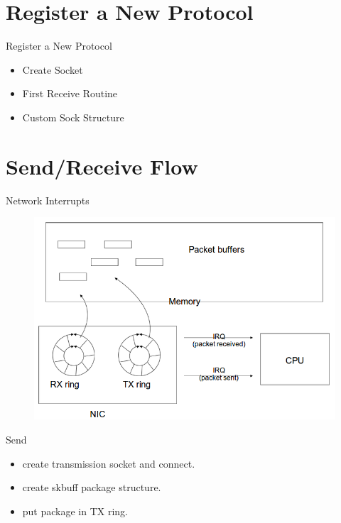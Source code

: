 \documentclass{workshop}
\begin{document}
\section{Register a New Protocol}
\begin{frame}{Register a New Protocol}
\begin{itemize}
\item Create Socket\\

\item First Receive Routine\\

\item Custom Sock Structure\\

\end{itemize}
\end{frame}

\section{Send/Receive Flow}
\begin{frame}{Network Interrupts}
\begin{figure}
  \includegraphics[scale=0.35]{img/rxtx.png}
\end{figure}
\end{frame}

\begin{frame}{Send}
\begin{itemize}
\item create transmission socket and connect.
\item create skbuff package structure.
\item put package in TX ring.
\end{itemize}
\end{frame}
\end{document}
